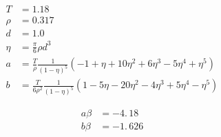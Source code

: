 \documentclass[aps,preprint]{revtex4-1}%
\begin{document}
\bigskip%
\begin{align*}
T  & =1.18\\
\rho & =0.317\\
d  & =1.0\\
\eta & =\frac{\pi}{6}\rho d^{3}\\
a  & =\frac{T}{\rho}\frac{1}{\left(  1-\eta\right)  ^{5}}\left(
-1+\eta+10\eta^{2}+6\eta^{3}-5\eta^{4}+\eta^{5}\right)  \\
b  & =\frac{T}{6\rho^{2}}\frac{1}{\left(  1-\eta\right)  ^{5}}\left(
1-5\eta-20\eta^{2}-4\eta^{3}+5\eta^{4}-\eta^{5}\right)
\end{align*}
%

\begin{align*}
a\beta & =-4.\,\allowbreak18\\
b\beta & =-1.\,\allowbreak626
\end{align*}


\bigskip

\bigskip

\bigskip
\end{document}
